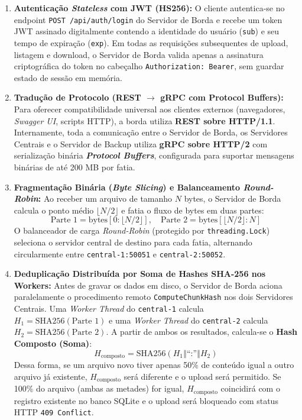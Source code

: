 \documentclass[12pt]{article}
\begin{document}
\begin{enumerate}
    \item \textbf{Autenticação \textit{Stateless} com JWT (HS256):}
    O cliente autentica-se no endpoint \texttt{POST /api/auth/login} do Servidor de Borda e recebe um token JWT assinado digitalmente contendo a identidade do usuário (\texttt{sub}) e seu tempo de expiração (\texttt{exp}). Em todas as requisições subsequentes de upload, listagem e download, o Servidor de Borda valida apenas a assinatura criptográfica do token no cabeçalho \texttt{Authorization: Bearer}, sem guardar estado de sessão em memória.

    \item \textbf{Tradução de Protocolo (REST $\rightarrow$ gRPC com Protocol Buffers):}
    Para oferecer compatibilidade universal aos clientes externos (navegadores, \textit{Swagger UI}, scripts HTTP), a borda utiliza \textbf{REST sobre HTTP/1.1}. Internamente, toda a comunicação entre o Servidor de Borda, os Servidores Centrais e o Servidor de Backup utiliza \textbf{gRPC sobre HTTP/2} com serialização binária \textbf{\textit{Protocol Buffers}}, configurada para suportar mensagens binárias de até 200 MB por fatia.

    \item \textbf{Fragmentação Binária (\textit{Byte Slicing}) e Balanceamento \textit{Round-Robin}:}
    Ao receber um arquivo de tamanho $N$ bytes, o Servidor de Borda calcula o ponto médio $\lfloor N / 2 \rfloor$ e fatia o fluxo de bytes em duas partes:
    \[
        \text{Parte 1} = \text{bytes}[0 : \lfloor N/2 \rfloor], \quad \text{Parte 2} = \text{bytes}[\lfloor N/2 \rfloor : N]
    \]
    O balanceador de carga \textit{Round-Robin} (protegido por \texttt{threading.Lock}) seleciona o servidor central de destino para cada fatia, alternando circularmente entre \texttt{central-1:50051} e \texttt{central-2:50052}.

    \item \textbf{Deduplicação Distribuída por Soma de Hashes SHA-256 nos Workers:}
    Antes de gravar os dados em disco, o Servidor de Borda aciona paralelamente o procedimento remoto \texttt{ComputeChunkHash} nos dois Servidores Centrais. Uma \textit{Worker Thread} do \texttt{central-1} calcula $H_1 = \text{SHA256}(\text{Parte 1})$ e uma \textit{Worker Thread} do \texttt{central-2} calcula $H_2 = \text{SHA256}(\text{Parte 2})$. A partir de ambos os resultados, calcula-se o \textbf{Hash Composto (Soma)}:
    \[
        H_{\text{composto}} = \text{SHA256}(H_1 \mathbin{\Vert} \text{``:''} \mathbin{\Vert} H_2)
    \]
    Dessa forma, se um arquivo novo tiver apenas 50\% de conteúdo igual a outro arquivo já existente, $H_{\text{composto}}$ será diferente e o upload será permitido. Se 100\% do arquivo (ambas as metades) for igual, $H_{\text{composto}}$ coincidirá com o registro existente no banco SQLite e o upload será bloqueado com status HTTP \texttt{409 Conflict}.


\end{enumerate}
\end{document}
